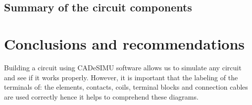 \documentclass[runningheads]{llncs}
\begin{document}
\subsection{Summary of the circuit components}



\section{Conclusions and recommendations}
Building a circuit using CADeSIMU software allows us to simulate any circuit and see if it works properly. However,
it is important that the labeling of the terminals of: the elements, contacts, coils, terminal blocks and connection cables 
are used correctly hence it helps to comprehend these diagrams.



% 
% 
\end{document}
